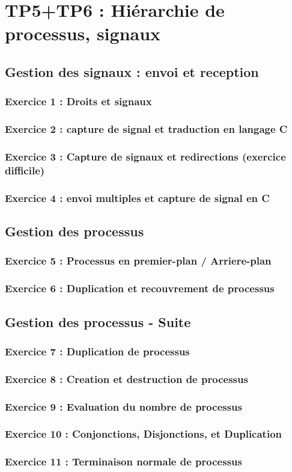 \chapter{TP5+TP6 : Hiérarchie de processus, signaux}
    \section{Gestion des signaux : envoi et reception}
        \subsection{Exercice 1 : Droits et signaux}
        \subsection{Exercice 2 : capture de signal et traduction en langage C}
        \subsection{Exercice 3 : Capture de signaux et redirections (exercice difficile)}
        \subsection{Exercice 4 : envoi multiples et capture de signal en C}
    \section{Gestion des processus}
        \subsection{Exercice 5 : Processus en premier-plan / Arriere-plan}
        \subsection{Exercice 6 : Duplication et recouvrement de processus}
    \section{Gestion des processus - Suite}
        \subsection{Exercice 7 : Duplication de processus}
        \subsection{Exercice 8 : Creation et destruction de processus}
        \subsection{Exercice 9 : Evaluation du nombre de processus}
        \subsection{Exercice 10 : Conjonctions, Disjonctions, et Duplication}
        \subsection{Exercice 11 : Terminaison normale de processus}
